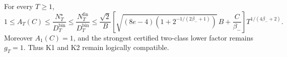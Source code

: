 For every \(T\ge1\), \[1\le A_T(C)\le\frac{N_T^\star}{D_T^{\mathrm{bin}}}\le\frac{N_T^{\mathrm{fin}}}{D_T^{\mathrm{bin}}}\le\frac{\sqrt2}{B}\left[\sqrt{(8e-4)\left(1+2^{-1/(2\beta_-+1)}\right)}\,B+\frac C{\beta_-}\right]T^{1/(4\beta_-+2)}.\] Moreover \(A_1(C)=1\), and the strongest certified two-class lower factor remains \(g_T=1\). Thus K1 and K2 remain logically compatible.